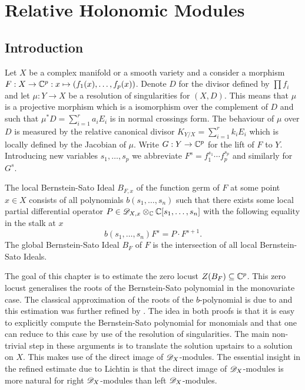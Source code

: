 \chapter{Relative Holonomic Modules}\label{ch: ChapterRelHol}
\section{Introduction}\label{sec: IntoductionChapterRelative}
Let $X$ be a complex manifold or a smooth variety and a consider a morphism $F:X\to \mathbb{C}^p: x \mapsto (f_1(x), \ldots, f_p(x))$.
Denote $D$ for the divisor defined by $\prod f_i$ and let $\mu:Y\to X$ be a resolution of singularities for $(X,D)$.
This means that $\mu$ is a projective morphism which is a isomorphism over the complement of $D$ and such that $\mu^*D = \sum_{i=1}^r a_i E_i$ is in normal crossings form.
The behaviour of $\mu$ over $D$ is measured by the relative canonical divisor $K_{Y/X} = \sum_{i=1}^r k_i E_i$ which is locally defined by the Jacobian of $\mu$.
Write $G:Y\to \mathbb{C}^p$ for the lift of $F$ to $Y$.
Introducing new variables $s_1,\ldots,s_p$ we abbreviate $F^s= f_1^{s_1} \cdots f_p^{s_p}$ and similarly for $G^s$.


The local Bernstein-Sato Ideal $B_{F,x}$ of the function germ of $F$ at some point $x\in X$ consists of all polynomials $b(s_1,\ldots, s_n)$ such that there exists some local partial differential operator $P\in \mathscr{D}_{X,x}\otimes_{\mathbb{C}} \mathbb{C}[s_1,\ldots,s_n]$ with the following equality in the stalk at $x$
$$b(s_1,\ldots, s_n) F^s = P\cdot F^{s+1}.$$
The global Bernstein-Sato Ideal $B_F$ of $F$ is the intersection of all local Bernstein-Sato Ideals.

The goal of this chapter is to estimate the zero locust $Z(B_{F})\subseteq \mathbb{C}^p$.
This zero locust generalises the roots of the Bernstein-Sato polynomial in the monovariate case.
The classical approximation of the roots of the $b$-polynomial is due to \cite{kashiwara1976b} and this estimation was further refined by \cite{lichtin1989poles}.
The idea in both proofs is that it is easy to explicitly compute the Bernstein-Sato polynomial for monomials and that one can reduce to this case by use of the resolution of singularities.
The main non-trivial step in these arguments is to translate the solution upstairs to a solution on $X$.
This makes use of the direct image of $\mathscr{D}_X$-modules.
The essential insight in the refined estimate due to Lichtin is that the direct image of $\mathscr{D}_X$-modules is more natural for right $\mathscr{D}_X$-modules than left $\mathscr{D}_X$-modules.


